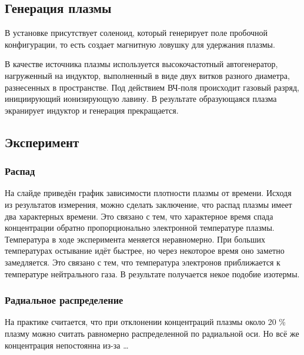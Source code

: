 \subsection{Генерация плазмы} %
В установке присутствует соленоид, который генерирует поле пробочной конфигурации, то есть создает магнитную ловушку для удержания плазмы.

В качестве источника плазмы используется высокочастотный автогенератор, нагруженный на индуктор, выполненный в виде двух витков разного диаметра, разнесенных в пространстве. Под действием ВЧ-поля происходит газовый разряд, инициирующий ионизирующую лавину. В результате образующаяся плазма экранирует индуктор и генерация прекращается.  


\subsection{Эксперимент} %
\subsubsection{Распад}

На слайде приведён график зависимости плотности плазмы от времени. Исходя из результатов измерения, можно сделать заключение, что  распад плазмы имеет два характерных времени. Это связано с тем, что характерное время спада концентрации обратно пропорционально электронной температуре плазмы.
Температура в ходе эксперимента меняется неравномерно.
При больших температурах остывание идёт быстрее, но через некоторое время оно заметно замедляется. Это связано с тем, что температура электронов приближается к температуре нейтрального газа. В результате получается некое подобие изотермы. 



\subsubsection{Радиальное распределение}
На практике считается, что  при отклонении концентраций плазмы около 20 \% плазму можно считать равномерно распределенной по радиальной оси. 
Но всё же концентрация непостоянна из-за \dots
  

